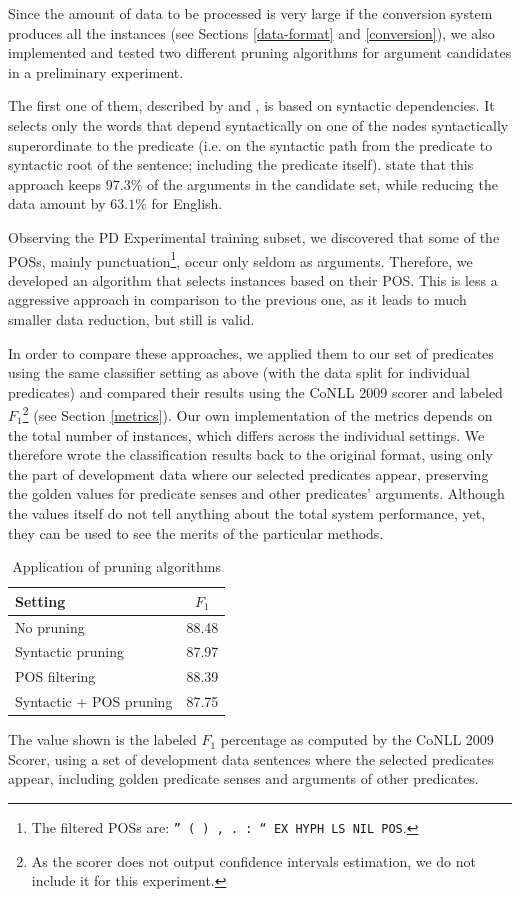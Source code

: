 \documentclass[12pt,notitlepage]{report}
\begin{document}
Since the amount of data to be processed is very large if the conversion system produces all the instances (see Sections \ref{data-format} and \ref{conversion}), we also implemented and tested two different pruning algorithms for argument candidates in a preliminary experiment. 

The first one of them, described by \citet{asahara09} and \citet{zhao09}, is based on syntactic dependencies. It selects only the words that depend syntactically on one of the nodes syntactically superordinate to the predicate (i.e. on the syntactic path from the predicate to syntactic root of the sentence; including the predicate itself). \citeauthor{asahara09} state that this approach keeps $97.3\%$ of the arguments in the candidate set, while reducing the data amount by $63.1\%$ for English.

Observing the PD Experimental training subset, we discovered that some of the POSs, mainly punctuation\footnote{The filtered POSs are: \texttt{'' ( ) , . : `` EX HYPH LS NIL POS}.}, occur only seldom as arguments. Therefore, we developed an algorithm that selects instances based on their POS. This is less a aggressive approach in comparison to the previous one, as it leads to much smaller data reduction, but still is valid. 

In order to compare these approaches, we applied them to our set of predicates using the same classifier setting as above (with the data split for individual predicates) and compared their results using the CoNLL 2009 scorer and labeled $F_1$\footnote{As the scorer does not output confidence intervals estimation, we do not include it for this experiment.} (see Section \ref{metrics}). Our own implementation of the metrics depends on the total number of instances, which differs across the individual settings. We therefore wrote the classification results back to the original format, using only the part of development data where our selected predicates appear, preserving the golden values for predicate senses and other predicates' arguments. Although the values itself do not tell anything about the total system performance, yet, they can be used to see the merits of the particular methods.

\begin{table}[htb]\label{tab:prune}
\caption{Application of pruning algorithms}\footnotesize
\begin{center}
\begin{tabular}{|l|c|}\hline
\bf Setting & $F_1$ \\\hline
No pruning & 88.48 \\
Syntactic pruning & 87.97 \\
POS filtering & 88.39 \\
Syntactic + POS pruning & 87.75 \\
\end{tabular}
\end{center}
The value shown is the labeled $F_1$ percentage as computed by the CoNLL 2009 Scorer, using a set of development data sentences where the selected predicates appear, including golden predicate senses and arguments of other predicates.
\end{table}
\end{document}
